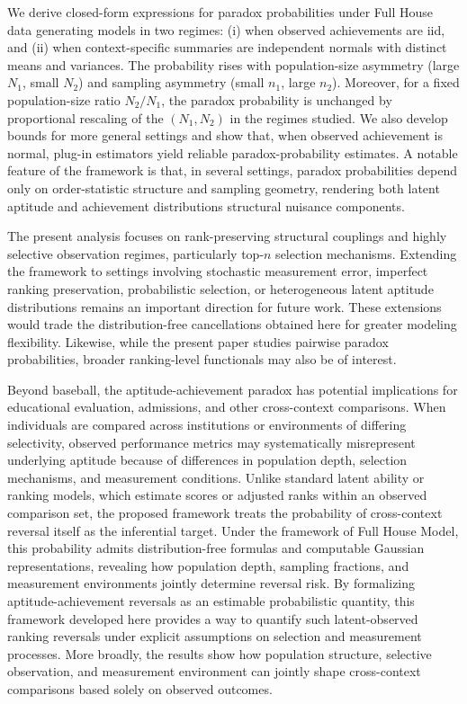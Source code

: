 \documentclass[12pt]{article}
\begin{document}
We derive closed-form expressions for paradox probabilities under Full House data generating models in two regimes: (i) when observed achievements are iid, and (ii) when context-specific summaries are independent normals with distinct means and variances. The probability rises with population-size asymmetry (large $N_1$, small $N_2$) and sampling asymmetry (small $n_1$, large $n_2$). Moreover, for a fixed population-size ratio $N_2/N_1$, the paradox probability is unchanged by proportional rescaling of the $(N_1,N_2)$ in the regimes studied. We also develop bounds for more general settings and show that, when observed achievement is normal, plug-in estimators yield reliable paradox-probability estimates. A notable feature of the framework is that, in several settings, paradox probabilities depend only on order-statistic structure and sampling geometry, rendering both latent aptitude and achievement distributions structural nuisance components.

The present analysis focuses on rank-preserving structural couplings and highly selective observation regimes, particularly top-$n$ selection mechanisms. Extending the framework to settings involving stochastic measurement error, imperfect ranking preservation, probabilistic selection, or heterogeneous latent aptitude distributions remains an important direction for future work. These extensions would trade the distribution-free cancellations obtained here for greater modeling flexibility. Likewise, while the present paper studies pairwise paradox probabilities, broader ranking-level functionals may also be of interest.

Beyond baseball, the aptitude-achievement paradox has potential implications for educational evaluation, admissions, and other cross-context comparisons. When individuals are compared across institutions or environments of differing selectivity, observed performance metrics may systematically misrepresent underlying aptitude because of differences in population depth, selection mechanisms, and measurement conditions. Unlike standard latent ability or ranking models, which estimate scores or adjusted ranks within an observed comparison set, the proposed framework treats the probability of cross-context reversal itself as the inferential target. Under the framework of Full House Model, this probability admits distribution-free formulas and computable Gaussian representations, revealing how population depth, sampling fractions, and measurement environments jointly determine reversal risk. By formalizing aptitude-achievement reversals as an estimable probabilistic quantity, this framework developed here provides a way to quantify such latent-observed ranking reversals under explicit assumptions on selection and measurement processes. More broadly, the results show how population structure, selective observation, and measurement environment can jointly shape cross-context comparisons based solely on observed outcomes.
\end{document}

